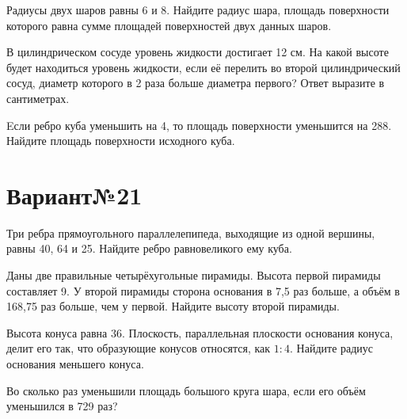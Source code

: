 \documentclass[4apaper]{article}
\begin{document}
\begin{taskBN}{4}
Радиусы двух шаров равны $6$ и $8$. Найдите радиус шара, площадь поверхности которого равна сумме площадей поверхностей двух данных шаров.
\end{taskBN}

\begin{taskBN}{5}
В цилиндрическом сосуде уровень жидкости достигает 12 см. На какой высоте будет находиться уровень жидкости, если её перелить во второй цилиндрический сосуд, диаметр которого в 2 раза больше диаметра первого? Ответ выразите в сантиметрах.
\end{taskBN}

\begin{taskBN}{6}
Eсли ребро куба уменьшить на 4, то площадь поверхности уменьшится на 288. Найдите площадь поверхности исходного куба.
\end{taskBN}
\newpage\section*{Вариант№21}

\begin{taskBN}{1}
Три ребра прямоугольного параллелепипеда, выходящие из одной вершины, равны 40, 64 и 25. Найдите ребро равновеликого ему куба.
\end{taskBN}

\begin{taskBN}{2}
Даны две правильные четырёхугольные пирамиды. Высота первой пирамиды составляет 9. У второй пирамиды сторона основания в 7,5 раз больше, а объём в 168,75 раз больше, чем у первой. Найдите высоту второй пирамиды.
\end{taskBN}

\begin{taskBN}{3}
Высота конуса равна $36$. Плоскость, параллельная плоскости основания конуса,  делит его так, что образующие конусов относятся, как $1:4$. Найдите радиус основания меньшего конуса. 
\end{taskBN}

\begin{taskBN}{4}
Во сколько раз уменьшили площадь большого круга шара, если его объём уменьшился в 729 раз?
\end{taskBN}
\end{document}
